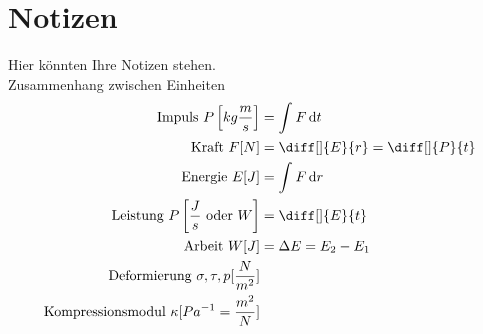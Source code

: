 \documentclass[a4paper,12pt]{article}
\newcommand{\td}{\,\text{d}}
\begin{document}


\section{Notizen}
Hier könnten Ihre Notizen stehen.\\
Zusammenhang zwischen Einheiten
\begin{align*}
        \text{Impuls }P\left[kg\dfrac{m}{s}\right]&=\int_{}^{}F\td t\\
        \text{Kraft }F[N]&=\diff[]{E}{r}=\diff[]{P}{t}\\
        \text{Energie }E[J]&=\int_{}^{}F\td r\\
        \text{Leistung }P\left[\dfrac{J}{s}\text{ oder }W\right]&=\diff[]{E}{t}\\
        \text{Arbeit }W[J]&=\Delta E=E_2-E_1\\
        \text{Deformierung }\sigma ,\tau ,p[\dfrac{N}{m^2}]\\
        \text{Kompressionsmodul }\kappa[Pa^{-1}=\dfrac{m^2}{N}]
\end{align*}

\end{document}
